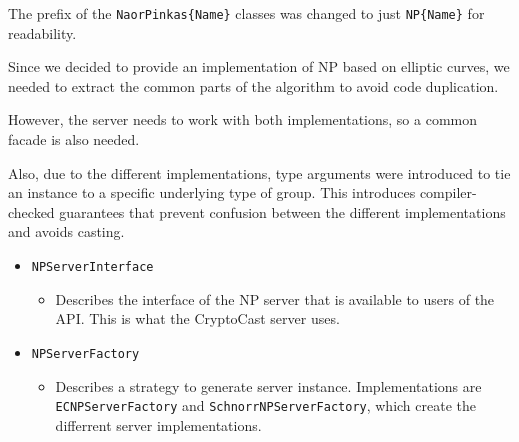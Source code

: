 \documentclass[a4paper,10pt]{scrartcl}
\begin{document}
The prefix of the \lstinline|NaorPinkas{Name}| classes was changed to just \lstinline|NP{Name}| for readability.

Since we decided to provide an implementation of NP based on elliptic curves, we needed to extract
the common parts of the algorithm to avoid code duplication.

However, the server needs to work with both implementations, so a common facade is also needed.

Also, due to the different implementations, type arguments were introduced to tie an instance
to a specific underlying type of group. This introduces compiler-checked guarantees that prevent
confusion between the different implementations and avoids casting.

\begin{itemize}
  \item \lstinline|NPServerInterface|
	\begin{itemize}
		\item Describes the interface of the NP server that is available to users of the API.
		      This is what the CryptoCast server uses.
	\end{itemize}

	\item \lstinline|NPServerFactory|
	\begin{itemize}
		\item Describes a strategy to generate server instance. Implementations are
		      \lstinline|ECNPServerFactory| and \lstinline|SchnorrNPServerFactory|, which
					create the differrent server implementations.
	\end{itemize}
\end{itemize}
\end{document}
